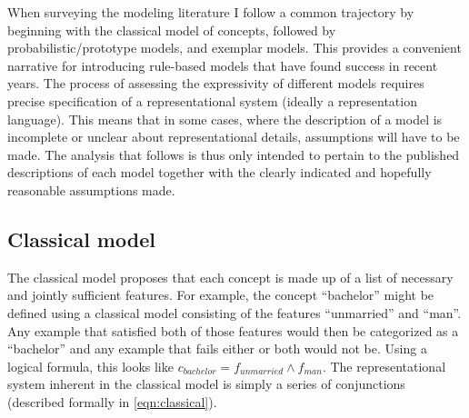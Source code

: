 \documentclass[doc,floatsintext]{apa6}
\begin{document}
When surveying the modeling literature I follow a common trajectory \citep[e.g.][]{smithm1981,laurencem1999,murphy2002} by beginning with the classical model of concepts, followed by probabilistic/prototype models, and exemplar models. 
This provides a convenient narrative for introducing rule-based models that have found success in recent years.
The process of assessing the expressivity of different models requires precise specification of a representational system (ideally a representation language).
This means that in some cases, where the description of a model is incomplete or unclear about representational details, assumptions will have to be made.
The analysis that follows is thus only intended to pertain to the published descriptions of each model together with the clearly indicated and hopefully reasonable assumptions made.

\subsection{Classical model}

The classical model proposes that each concept is made up of a list of necessary and jointly sufficient features. For example, the concept ``bachelor'' might be defined using a classical model consisting of the features ``unmarried'' and ``man''. Any example that satisfied both of those features would then be categorized as a ``bachelor'' and any example that fails either or both would not be. Using a logical formula, this looks like $c_{bachelor} = f_{unmarried} \wedge f_{man}$. The representational system inherent in the classical model is simply a series of conjunctions (described formally in \cref{eqn:classical}).


\end{document}
